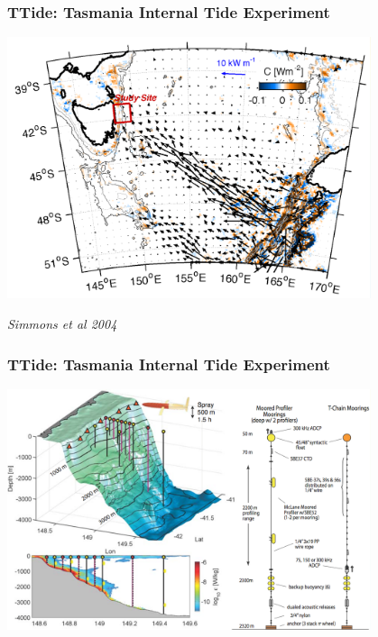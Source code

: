\documentclass{beamer}
\begin{document}
\begin{frame}
  \frametitle{TTide: Tasmania Internal Tide Experiment}
  \begin{center}
  \includegraphics[width=0.8\textwidth]{doc/SiteMap.png}
  \end{center}
  \emph{Simmons et al 2004}
\end{frame}

\begin{frame}
  \frametitle{TTide: Tasmania Internal Tide Experiment}
  \begin{center}
  \includegraphics[width=0.8\textwidth]{doc/ExperimentSketch.png}
  \end{center}
\end{frame}
\end{document}
